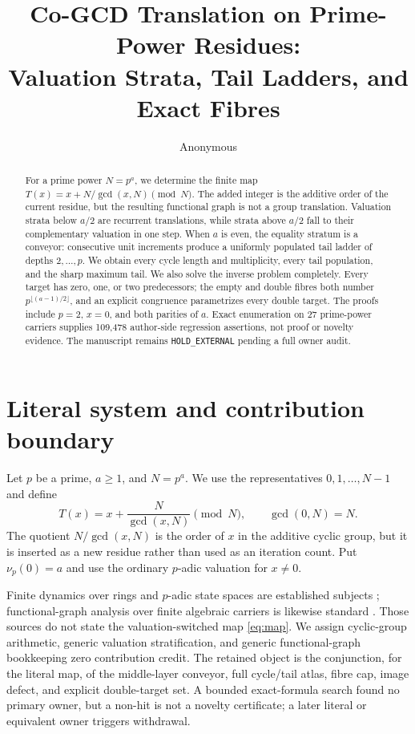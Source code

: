 \documentclass[a4paper,10pt]{amsart}
\title[Co-gcd translation on prime powers]{Co-GCD Translation on Prime-Power Residues:\\
Valuation Strata, Tail Ladders, and Exact Fibres}
\author{Anonymous}
\date{}
\theoremstyle{remark}
\newcommand{\vp}{\nu_p}
\begin{document}
\begin{abstract}
For a prime power $N=p^a$, we determine the finite map
$T(x)=x+N/\gcd(x,N)\pmod N$.  The added integer is the additive order of the
current residue, but the resulting functional graph is not a group
translation.  Valuation strata below $a/2$ are recurrent translations, while
strata above $a/2$ fall to their complementary valuation in one step.  When
$a$ is even, the equality stratum is a conveyor: consecutive unit increments
produce a uniformly populated tail ladder of depths $2,\ldots,p$.  We obtain
every cycle length and multiplicity, every tail population, and the sharp
maximum tail.  We also solve the inverse problem completely.  Every target
has zero, one, or two predecessors; the empty and double fibres both number
$p^{\lfloor(a-1)/2\rfloor}$, and an explicit congruence parametrizes every
double target.  The proofs include $p=2$, $x=0$, and both parities of $a$.
Exact enumeration on 27 prime-power carriers supplies 109,478 author-side
regression assertions, not proof or novelty evidence.  The manuscript remains
\texttt{HOLD\_EXTERNAL} pending a full owner audit.
\end{abstract}

\maketitle

\section{Literal system and contribution boundary}

Let $p$ be a prime, $a\geq1$, and $N=p^a$.  We use the representatives
$0,1,\ldots,N-1$ and define
\begin{equation}\label{eq:map}
 T(x)=x+\frac{N}{\gcd(x,N)}\pmod N,
 \qquad \gcd(0,N)=N.
\end{equation}
The quotient $N/\gcd(x,N)$ is the order of $x$ in the additive cyclic group,
but it is inserted as a new residue rather than used as an iteration count.
Put $\vp(0)=a$ and use the ordinary $p$-adic valuation for $x\ne0$.

Finite dynamics over rings and $p$-adic state spaces are established subjects
\cite{XuZou2009,AnashinKhrennikov2009}; functional-graph analysis over finite
algebraic carriers is likewise standard \cite{KonyaginEtAl2016}.  Those
sources do not state the valuation-switched map \eqref{eq:map}.  We assign
cyclic-group arithmetic, generic valuation stratification, and generic
functional-graph bookkeeping zero contribution credit.  The retained object
is the conjunction, for the literal map, of the middle-layer conveyor, full
cycle/tail atlas, fibre cap, image defect, and explicit double-target set.
A bounded exact-formula search found no primary owner, but a non-hit is not a
novelty certificate; a later literal or equivalent owner triggers withdrawal.
\end{document}
